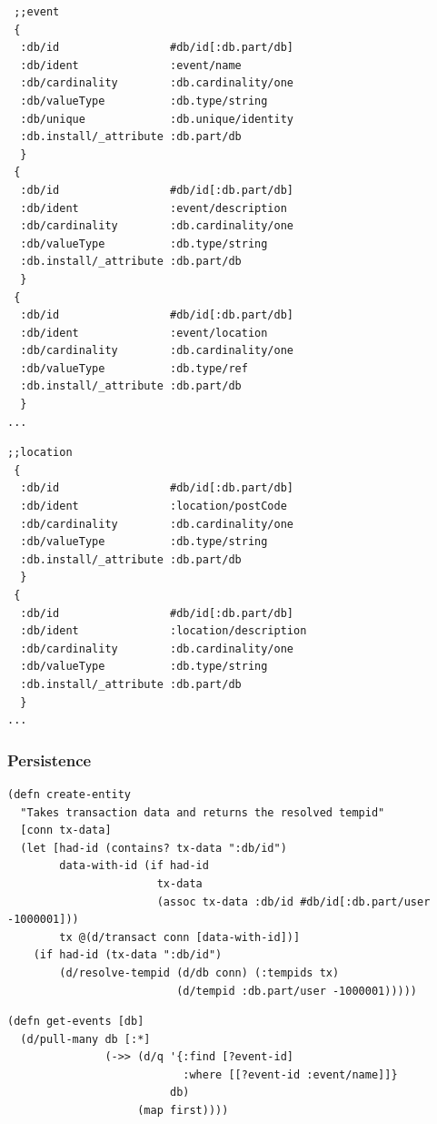 \documentclass[11pt]{article}
\begin{document}
\begin{verbatim}
 ;;event
 {
  :db/id                 #db/id[:db.part/db]
  :db/ident              :event/name
  :db/cardinality        :db.cardinality/one
  :db/valueType          :db.type/string
  :db/unique             :db.unique/identity
  :db.install/_attribute :db.part/db
  }
 {
  :db/id                 #db/id[:db.part/db]
  :db/ident              :event/description
  :db/cardinality        :db.cardinality/one
  :db/valueType          :db.type/string
  :db.install/_attribute :db.part/db
  }
 {
  :db/id                 #db/id[:db.part/db]
  :db/ident              :event/location
  :db/cardinality        :db.cardinality/one
  :db/valueType          :db.type/ref
  :db.install/_attribute :db.part/db
  }
...
\end{verbatim}
\begin{verbatim}
;;location
 {
  :db/id                 #db/id[:db.part/db]
  :db/ident              :location/postCode
  :db/cardinality        :db.cardinality/one
  :db/valueType          :db.type/string
  :db.install/_attribute :db.part/db
  }
 {
  :db/id                 #db/id[:db.part/db]
  :db/ident              :location/description
  :db/cardinality        :db.cardinality/one
  :db/valueType          :db.type/string
  :db.install/_attribute :db.part/db
  }
...
\end{verbatim}
\subsubsection*{Persistence}
\label{sec:orgheadline26}

\begin{verbatim}
(defn create-entity
  "Takes transaction data and returns the resolved tempid"
  [conn tx-data]
  (let [had-id (contains? tx-data ":db/id")
        data-with-id (if had-id
                       tx-data
                       (assoc tx-data :db/id #db/id[:db.part/user -1000001]))
        tx @(d/transact conn [data-with-id])]
    (if had-id (tx-data ":db/id")
        (d/resolve-tempid (d/db conn) (:tempids tx)
                          (d/tempid :db.part/user -1000001)))))
\end{verbatim}
\begin{verbatim}
(defn get-events [db]
  (d/pull-many db [:*]
               (->> (d/q '{:find [?event-id]
                           :where [[?event-id :event/name]]}
                         db)
                    (map first))))
\end{verbatim}
\end{document}
